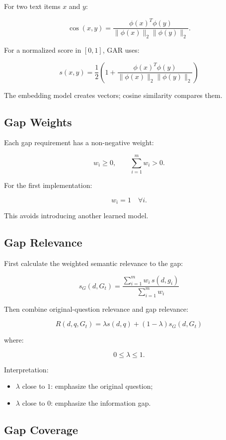 \documentclass[11pt,a4paper]{article}
\begin{document}
For two text items $x$ and $y$:

\[
\operatorname{cos}(x,y)
=
\frac{\phi(x)^T\phi(y)}
{\|\phi(x)\|_2\|\phi(y)\|_2}.
\]

For a normalized score in $[0,1]$, GAR uses:

\[
\boxed{
s(x,y)
=
\frac{1}{2}
\left(
1+
\frac{\phi(x)^T\phi(y)}
{\|\phi(x)\|_2\|\phi(y)\|_2}
\right)
}
\tag{1}
\]

The embedding model creates vectors; cosine similarity compares them.

\subsection{Gap Weights}

Each gap requirement has a non-negative weight:

\[
w_i\geq0,
\qquad
\sum_{i=1}^{m}w_i>0.
\]

For the first implementation:

\[
\boxed{w_i=1\quad\forall i.}
\]

This avoids introducing another learned model.

\subsection{Gap Relevance}

First calculate the weighted semantic relevance to the gap:

\[
\boxed{
s_G(d,G_t)
=
\frac{
\sum_{i=1}^{m}w_i\,s(d,g_i)
}{
\sum_{i=1}^{m}w_i
}
}
\tag{2}
\]

Then combine original-question relevance and gap relevance:

\[
\boxed{
R(d,q,G_t)
=
\lambda s(d,q)
+
(1-\lambda)s_G(d,G_t)
}
\tag{3}
\]

where:

\[
0\leq\lambda\leq1.
\]

Interpretation:

\begin{itemize}[leftmargin=1.5em]
\item $\lambda$ close to $1$: emphasize the original question;
\item $\lambda$ close to $0$: emphasize the information gap.
\end{itemize}

\subsection{Gap Coverage}
\end{document}
